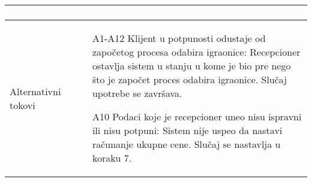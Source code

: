\documentclass[../../main.tex]{subfiles}
\begin{document}
\begin{longtable}{| p{} | p{} |}
\begin{enumerate}
    \end{enumerate}\\
\hline
    Alternativni tokovi & 
    \begin{itemize}
        \item[A1-A12] Klijent u potpunosti odustaje od započetog procesa odabira igraonice: Recepcioner ostavlja sistem u stanju u kome je bio pre nego što je započet proces odabira igraonice. Slučaj upotrebe se završava.
        \item[A10] Podaci koje je recepcioner uneo nisu ispravni ili nisu potpuni: Sistem nije uspeo da nastavi računanje ukupne cene. Slučaj se nastavlja u koraku 7.

\end{itemize}
\end{longtable}
\end{document}
